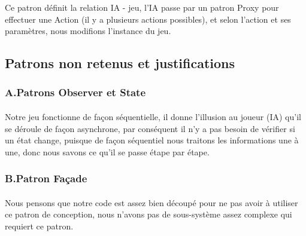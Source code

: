 \documentclass[13pt ,a4paper ]{report}
\begin{document}
\begin{multicols}{2}
Ce patron définit la relation IA - jeu, l’IA passe par un patron Proxy pour effectuer une Action (il y a plusieurs actions possibles), et selon l’action et ses paramètres, nous modifions l’instance du jeu.
		\subsection{Patrons non retenus et justifications}
			\subsubsection{A.\hspace*{0.5cm}Patrons Observer et State}
      		\paragraph{}
      		Notre jeu fonctionne de façon séquentielle, il donne l’illusion au joueur (IA) qu’il se déroule de façon asynchrone, par conséquent il n'y a pas besoin de vérifier si un état change, puisque de façon séquentiel nous traitons les informations une à une, donc nous savons ce qu’il se passe étape par étape.

			\subsubsection{B.\hspace*{0.5cm}Patron Façade}
      		\paragraph{}
      		Nous pensons que notre code est assez bien découpé pour ne pas avoir à utiliser ce patron de conception, nous n’avons pas de sous-système assez complexe qui requiert ce patron.

\end{multicols}
\newpage


\setcounter{subsection}{0} 
\end{document}
